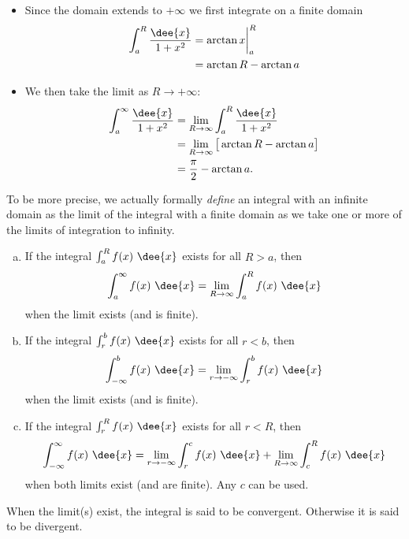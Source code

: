 \begin{eg}
\soln
\begin{itemize}
 \item Since the domain extends to $+\infty$ we first integrate on a finite
domain
\begin{align*}
  \int_a^R\frac{\dee{x}}{1+x^2}
  &= \arctan x\bigg|_a^R \\
  &= \arctan R - \arctan a
\end{align*}
\item We then take the limit as $R \to +\infty$:
\begin{align*}
 \int_a^\infty \frac{\dee{x}}{1+x^2}
&= \lim_{R\to\infty} \int_a^R\frac{\dee{x}}{1+x^2}\\
&= \lim_{R\to\infty} \big[ \arctan R - \arctan a\big]\\
&= \frac{\pi}{2} - \arctan a.
\end{align*}
\end{itemize}

\end{eg}

To be more precise, we actually formally \emph{define} an integral with an infinite domain
as the limit of the integral with a finite domain as we take one or more of the limits of
integration to infinity.
\begin{defn}\label{def:IItype1}
\begin{enumerate}[(a)]
\item  If the integral $\int_a^R f(x)\ \dee{x}$ exists for all $R>a$, then
\begin{equation*}
\int_a^\infty f(x)\ \dee{x}=\lim_{R\rightarrow\infty}\int_a^R f(x)\ \dee{x}
\end{equation*}
when the limit exists (and is finite).
\item  If the integral $\int_r^b f(x)\ \dee{x}$ exists for all $r<b$, then
\begin{equation*}
\int_{-\infty}^b f(x)\ \dee{x}=\lim_{r\rightarrow-\infty}\int_r^b f(x)\ \dee{x}
\end{equation*}
when the limit exists (and is finite).
\item  If the integral $\int_r^R f(x)\ \dee{x}$ exists for all $r<R$, then
\begin{equation*}
\int_{-\infty}^\infty f(x)\ \dee{x}=\lim_{r\rightarrow-\infty}\int_r^c f(x)\ \dee{x}
+\lim_{R\rightarrow\infty}\int_c^R f(x)\ \dee{x}
\end{equation*}
when both limits exist (and are finite). Any $c$ can be used.
\end{enumerate}
When the limit(s) exist, the integral is said to be convergent. Otherwise
it is said to be divergent.
\end{defn}

